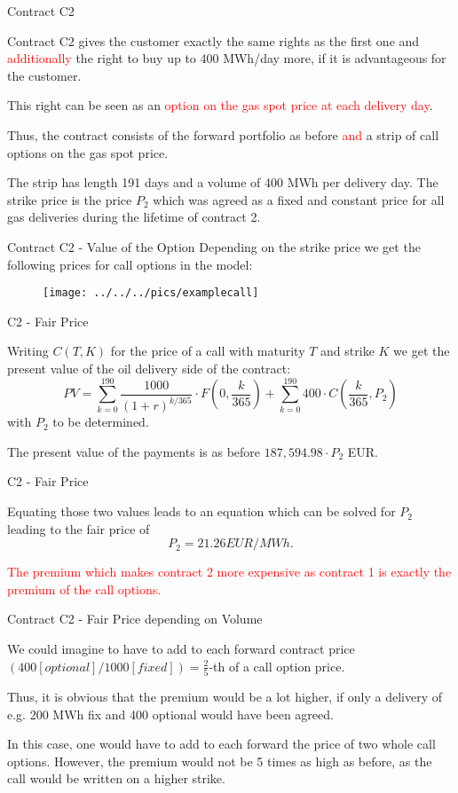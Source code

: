 
{Contract C2}
\item<1-> Contract C2 gives the customer exactly the same rights as the first one and \textcolor{red}{additionally} the right to buy up to 400 MWh/day more, if it is advantageous for the customer.
\item<2-> This right can be seen as an \textcolor{red}{option on the gas spot price at each delivery day}.
\item<3-> Thus, the contract consists of the forward portfolio as before \textcolor{red}{and} a strip of call options on the gas spot price.
\item<4-> The strip has length 191 days and a volume of 400 MWh per delivery day. The strike price is the price $P_2$ which was agreed as a fixed and constant price for all gas deliveries during the lifetime of contract 2.

{Contract C2 - Value of the Option}
Depending on the strike price we get the following prices for call options in the model:
\begin{figure}
	\centering
		\texttt{[image: ../../../pics/examplecall]}
	\label{fig:examplecall}
\end{figure}

{C2 - Fair Price}
\item<1->
Writing $C(T,K)$ for the price of a call with maturity $T$ and strike $K$ we get the present value of the oil delivery side of the contract:
$$
	PV = \sum_{k=0}^{190} \frac{1000}{(1+r)^{k/365}} \cdot F(0,\frac k {365}) + \sum_{k=0}^{190} 400 \cdot C(\frac k {365},P_2)
$$
with $P_2$ to be determined.
\item<2-> The present value of the payments is as before $187,594.98 \cdot P_2$ EUR.

{C2 - Fair Price}
\item<1->
Equating those two values leads to an equation which can be solved for $P_2$ leading to the fair price of
$$
	P_2 = 21.26 EUR/MWh.
$$
\item<2->
\textcolor{red}{The premium which makes contract 2 more expensive as contract 1 is exactly the premium of the call options.}

{Contract C2 - Fair Price depending on Volume}
\item<1-> We could imagine to have to add to each forward contract price $(400 [optional]/1000 [fixed]) = \frac 2 5$-th of a call option price.
\item<2-> Thus, it is obvious that the premium would be a lot higher, if only a delivery of e.g. 200 MWh fix and 400 optional would have been agreed.
\item<3-> In this case, one would have to add to each forward the price of two whole call options. However, the premium would not be 5 times as high as before, as the call would be written on a higher strike.


